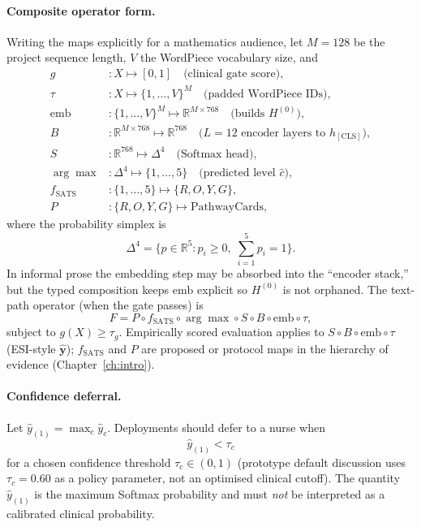 \paragraph{Composite operator form.}
Writing the maps explicitly for a mathematics audience, let \(M=128\) be the project sequence length, \(V\) the WordPiece vocabulary size, and
\begin{align*}
  g &: X \mapsto [0,1]
    \quad\text{(clinical gate score)}, \\
  \tau &: X \mapsto \{1,\ldots,V\}^{M}
    \quad\text{(padded WordPiece IDs)}, \\
  \mathrm{emb} &: \{1,\ldots,V\}^{M} \mapsto \mathbb{R}^{M\times 768}
    \quad\text{(builds \(H^{(0)}\))}, \\
  B &: \mathbb{R}^{M\times 768} \mapsto \mathbb{R}^{768}
    \quad\text{(\(L=12\) encoder layers to \(h_{\mathrm{[CLS]}}\))}, \\
  S &: \mathbb{R}^{768} \mapsto \Delta^{4}
    \quad\text{(Softmax head)}, \\
  \arg\max &: \Delta^{4} \mapsto \{1,\ldots,5\}
    \quad\text{(predicted level \(\hat{c}\))}, \\
  f_{\mathrm{SATS}} &: \{1,\ldots,5\} \mapsto \{R,O,Y,G\}, \\
  P &: \{R,O,Y,G\} \mapsto \text{PathwayCards},
\end{align*}
where the probability simplex is
\[
  \Delta^{4}=\bigl\{p\in\mathbb{R}^{5}: p_i\ge 0,\; \sum_{i=1}^{5}p_i=1\bigr\}.
\]
In informal prose the embedding step may be absorbed into the ``encoder stack,'' but the typed composition keeps \(\mathrm{emb}\) explicit so \(H^{(0)}\) is not orphaned. The text-path operator (when the gate passes) is
\begin{equation}
  F = P \circ f_{\mathrm{SATS}} \circ \arg\max \circ S \circ B \circ \mathrm{emb} \circ \tau,
  \label{eq:composite-F}
\end{equation}
subject to \(g(X)\ge \tau_g\). Empirically scored evaluation applies to \(S\circ B\circ\mathrm{emb}\circ\tau\) (ESI-style \(\hat{\mathbf{y}}\)); \(f_{\mathrm{SATS}}\) and \(P\) are proposed or protocol maps in the hierarchy of evidence (Chapter~\ref{ch:intro}).

\paragraph{Confidence deferral.}
Let \(\hat{y}_{(1)}=\max_c\hat{y}_c\). Deployments should defer to a nurse when
\begin{equation}
  \hat{y}_{(1)} < \tau_c
  \label{eq:tau-c}
\end{equation}
for a chosen confidence threshold \(\tau_c\in(0,1)\) (prototype default discussion uses \(\tau_c=0.60\) as a policy parameter, not an optimised clinical cutoff). The quantity \(\hat{y}_{(1)}\) is the maximum Softmax probability and must \emph{not} be interpreted as a calibrated clinical probability.

